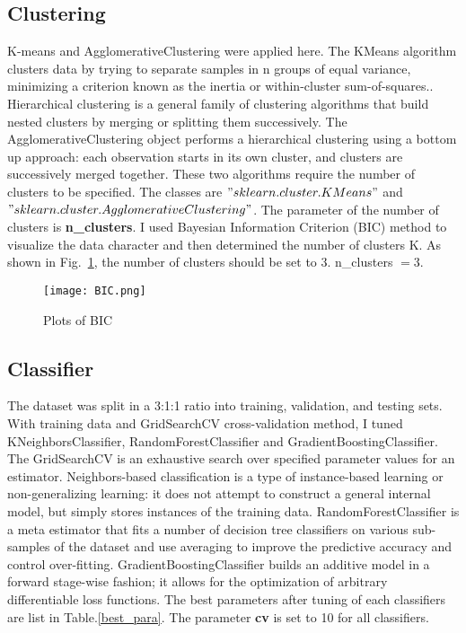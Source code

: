\documentclass{article}
\begin{document}
\subsection{Clustering}
K-means and AgglomerativeClustering were applied here. The KMeans algorithm clusters data by trying to separate samples in n groups of equal variance, minimizing a criterion known as the inertia or within-cluster sum-of-squares.\cite{arthur2007k}. Hierarchical clustering is a general family of clustering algorithms that build nested clusters by merging or splitting them successively.\cite{rokach2005clustering} The AgglomerativeClustering object performs a hierarchical clustering using a bottom up approach: each observation starts in its own cluster, and clusters are successively merged together. These two algorithms require the number of clusters to be specified. The classes are $"sklearn.cluster.KMeans"$ and  $"sklearn.cluster.AgglomerativeClustering"$. The parameter of the number of clusters is \textbf{n\_clusters}. I used Bayesian Information Criterion (BIC) method to visualize the data character and then determined the number of clusters K. As shown in Fig.~\ref{bic}, the number of clusters should be set to 3. n\_clusters $= 3$.

\begin{figure}[h]
    		\texttt{[image: BIC.png]}
		\centering
		\caption{Plots of BIC}
		\label{bic}
    		\end{figure}


\subsection{Classifier}
The dataset was split in a 3:1:1 ratio into training, validation, and testing sets. With training data and GridSearchCV cross-validation method, I tuned KNeighborsClassifier, RandomForestClassifier and GradientBoostingClassifier. The GridSearchCV is an exhaustive search over specified parameter values for an estimator.\cite{bergstra2012random} Neighbors-based classification is a type of instance-based learning or non-generalizing learning: it does not attempt to construct a general internal model, but simply stores instances of the training data.\cite{bentley1975multidimensional} RandomForestClassifier is a meta estimator that fits a number of decision tree classifiers on various sub-samples of the dataset and use averaging to improve the predictive accuracy and control over-fitting.\cite{breiman2001random} GradientBoostingClassifier builds an additive model in a forward stage-wise fashion; it allows for the optimization of arbitrary differentiable loss functions.\cite{friedman2001greedy}  The best parameters after tuning of each classifiers are list in Table.\ref{best_para}. The parameter \textbf{cv} is set to 10 for all classifiers. 
\end{document}
